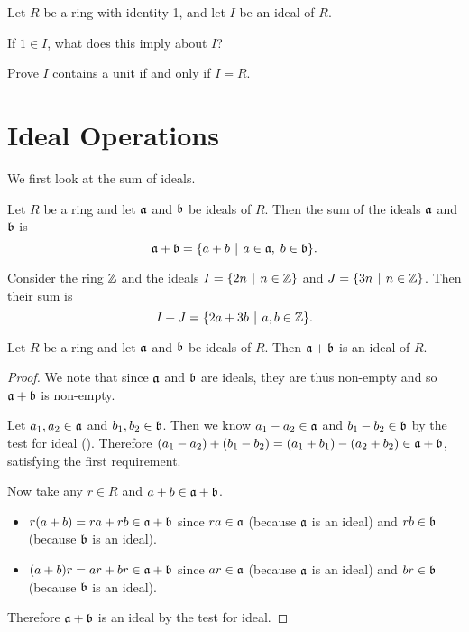 \begin{exercise}\label{exercise-ideal-contains-unit-iff-ideal-is-whole-ring}
    Let $R$ be a ring with identity 1, and let $I$ be an ideal of $R$.
    \begin{partquestions}{\roman*}
        \item If $1 \in I$, what does this imply about $I$?
        \item Prove $I$ contains a unit if and only if $I = R$.
    \end{partquestions}
\end{exercise}

\section{Ideal Operations}
We first look at the sum of ideals.
\begin{definition}
    Let $R$ be a ring and let $\mathfrak{a}$ and $\mathfrak{b}$ be ideals of $R$. Then the sum of the ideals $\mathfrak{a}$ and $\mathfrak{b}$ is
    \[
        \ideal{a} + \ideal{b} = \{a + b \vert a\in\ideal{a},\;b\in\ideal{b}\}.
    \]
\end{definition}
\begin{example}
    Consider the ring $\mathbb{Z}$ and the ideals $I = \{2n \vert n \in \Z\}$ and $J = \{3n \vert n \in \Z\}$. Then their sum is
    \[
        I + J = \{2a + 3b \vert a,b \in \Z\}.
    \]
\end{example}
\begin{proposition}\label{prop-sum-of-ideals-is-ideal}
    Let $R$ be a ring and let $\mathfrak{a}$ and $\mathfrak{b}$ be ideals of $R$. Then $\mathfrak{a} + \mathfrak{b}$ is an ideal of $R$.
\end{proposition}
\begin{proof}
    We note that since $\mathfrak{a}$ and $\mathfrak{b}$ are ideals, they are thus non-empty and so $\mathfrak{a}+\mathfrak{b}$ is non-empty.

    Let $a_1, a_2 \in \mathfrak{a}$ and $b_1, b_2 \in \mathfrak{b}$. Then we know $a_1 - a_2 \in \mathfrak{a}$ and $b_1 - b_2 \in \mathfrak{b}$ by the test for ideal (). Therefore $(a_1 - a_2) + (b_1 - b_2) = (a_1 + b_1) - (a_2 + b_2) \in \mathfrak{a} + \mathfrak{b}$, satisfying the first requirement.

    Now take any $r \in R$ and $a+b \in \mathfrak{a}+\mathfrak{b}$.
    \begin{itemize}
        \item $r(a+b) = ra + rb \in \mathfrak{a}+\mathfrak{b}$ since $ra \in \mathfrak{a}$ (because $\mathfrak{a}$ is an ideal) and $rb \in \mathfrak{b}$ (because $\mathfrak{b}$ is an ideal).
        \item $(a+b)r = ar + br \in \mathfrak{a}+\mathfrak{b}$ since $ar \in \mathfrak{a}$ (because $\mathfrak{a}$ is an ideal) and $br \in \mathfrak{b}$ (because $\mathfrak{b}$ is an ideal).
    \end{itemize}
    Therefore $\mathfrak{a} + \mathfrak{b}$ is an ideal by the test for ideal.
\end{proof}

